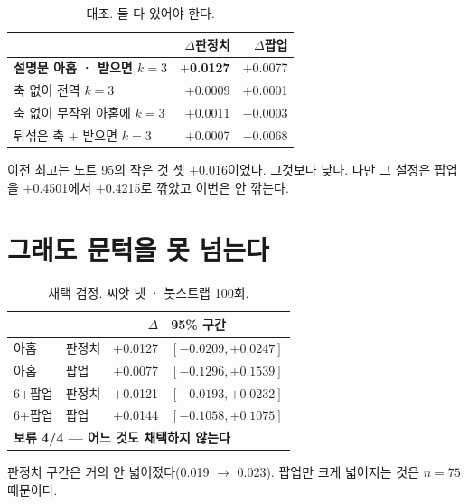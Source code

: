 \documentclass[10pt]{article}
\begin{document}
\begin{table}[t]
\centering\tsize
\caption{대조. 둘 다 있어야 한다.}
\begin{tabular}{lrr}
\toprule
& $\Delta$판정치 & $\Delta$팝업 \\
\midrule
\textbf{설명문 아홉 · 받으면 $k{=}3$} & \textbf{$+$0.0127} & $+$0.0077 \\
\midrule
축 없이 전역 $k{=}3$ & $+$0.0009 & $+$0.0001 \\
축 없이 무작위 아홉에 $k{=}3$ & $+$0.0011 & $-$0.0003 \\
뒤섞은 축 $+$ 받으면 $k{=}3$ & $+$0.0007 & $-$0.0068 \\
\bottomrule
\end{tabular}
\end{table}

{이전 최고는 노트 95의 작은 것 셋 $+$0.016이었다. 그것보다 낮다. 다만 그
설정은 팝업을 $+$0.4501에서 $+$0.4215로 깎았고 이번은 안 깎는다.}

\section{그래도 문턱을 못 넘는다}

\begin{table}[t]
\centering\tsize
\caption{채택 검정. 씨앗 넷 · 붓스트랩 100회.}
\begin{tabular}{llrl}
\toprule
& & $\Delta$ & 95\% 구간 \\
\midrule
아홉 & 판정치 & $+$0.0127 & $[-0.0209, +0.0247]$ \\
아홉 & 팝업 & $+$0.0077 & $[-0.1296, +0.1539]$ \\
6$+$팝업 & 판정치 & $+$0.0121 & $[-0.0193, +0.0232]$ \\
6$+$팝업 & 팝업 & $+$0.0144 & $[-0.1058, +0.1075]$ \\
\midrule
\multicolumn{4}{l}{\textbf{보류 4/4 --- 어느 것도 채택하지 않는다}} \\
\bottomrule
\end{tabular}
\end{table}

{판정치 구간은 거의 안 넓어졌다(0.019 $\to$ 0.023). 팝업만 크게 넓어지는 것은
$n{=}75$ 때문이다.}
\end{document}
